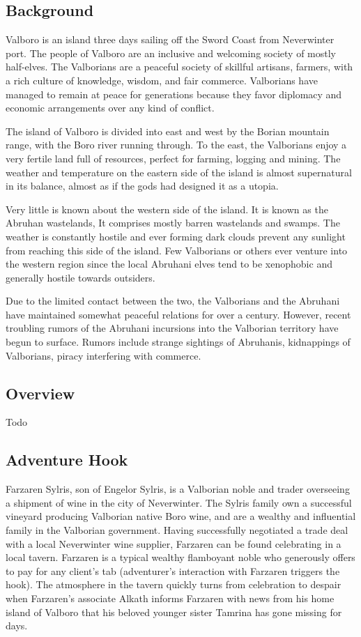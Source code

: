 \begin{multicols*}{2}
	\subsection*{Background}
	Valboro is an island three days sailing off the Sword Coast from Neverwinter port. The people of Valboro are an inclusive and welcoming society of mostly half-elves. The Valborians are a peaceful society of skillful artisans, farmers, with a rich culture of knowledge, wisdom, and fair commerce. Valborians have managed to remain at peace for generations because they favor diplomacy and economic arrangements over any kind of conflict.
	
	The island of Valboro is divided into east and west by the Borian mountain range, with the Boro river running through. To the east, the Valborians enjoy a very fertile land full of resources, perfect for farming, logging and mining. The weather and temperature on the eastern side of the island is almost supernatural in its balance, almost as if the gods had designed it as a utopia. 
	
	Very little is known about the western side of the island. It is known as the Abruhan wastelands, It comprises mostly barren wastelands and swamps. The weather is constantly hostile and ever forming dark clouds prevent any sunlight from reaching this side of the island. Few Valborians or others ever venture into the western region since the local Abruhani elves tend to be xenophobic and generally hostile towards outsiders.
	
	Due to the limited contact between the two, the Valborians and the Abruhani have maintained somewhat peaceful relations for over a century. However, recent troubling rumors of the Abruhani incursions into the Valborian territory have begun to surface. Rumors include strange sightings of Abruhanis, kidnappings of Valborians, piracy interfering with commerce.
	
	\subsection*{Overview}
	Todo
	
	\subsection*{Adventure Hook}
	Farzaren Sylris, son of Engelor Sylris, is a Valborian noble and trader overseeing a shipment of wine in the city of Neverwinter. The Sylris family own a successful vineyard producing Valborian native Boro wine, and are a wealthy and influential family in the Valborian government. Having successfully negotiated a trade deal with a local Neverwinter wine supplier, Farzaren can be found celebrating in a local tavern. Farzaren is a typical wealthy flamboyant noble who generously offers to pay for any client’s tab (adventurer’s interaction with Farzaren triggers the hook). The atmosphere in the tavern quickly turns from celebration to despair when Farzaren’s associate Alkath informs Farzaren with news from his home island of Valboro that his beloved younger sister Tamrina has gone missing for days. 
	

\end{multicols*}
